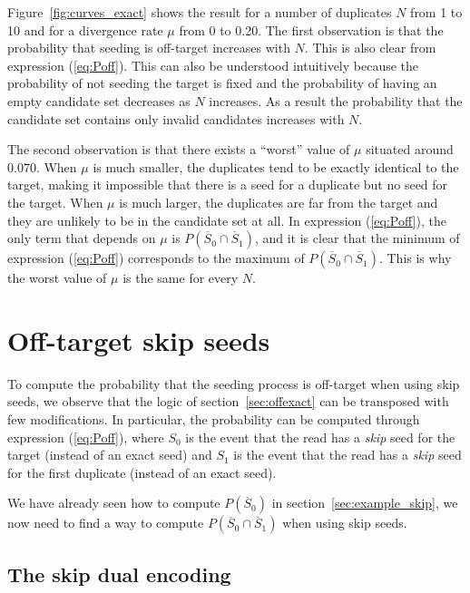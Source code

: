 \documentclass{article}
\begin{document}
Figure~\ref{fig:curves_exact} shows the result for a number of duplicates
$N$ from 1 to 10 and for a divergence rate $\mu$ from 0 to 0.20. The first
observation is that the probability that seeding is off-target increases
with $N$. This is also clear from expression (\ref{eq:Poff}). This can
also be understood intuitively because the probability of not seeding the
target is fixed and the probability of having an empty candidate set
decreases as $N$ increases. As a result the probability that the candidate
set contains only invalid candidates increases with $N$.

The second observation is that there exists a ``worst'' value of $\mu$
situated around 0.070. When $\mu$ is much smaller, the duplicates tend to
be exactly identical to the target, making it impossible that there is a
seed for a duplicate but no seed for the target. When $\mu$ is much
larger, the duplicates are far from the target and they are unlikely to be
in the candidate set at all. In expression (\ref{eq:Poff}), the only term
that depends on $\mu$ is $P(\overline{S}_0 \cap \overline{S}_1)$, and it
is clear that the minimum of expression (\ref{eq:Poff}) corresponds to the
maximum of $P(\overline{S}_0 \cap \overline{S}_1)$. This is why the worst
value of $\mu$ is the same for every $N$.


\section{Off-target skip seeds}
\label{sec_offskip}

To compute the probability that the seeding process is off-target when
using skip seeds, we observe that the logic of section~\ref{sec:offexact}
can be transposed with few modifications. In particular, the probability
can be computed through expression (\ref{eq:Poff}), where $S_0$ is the
event that the read has a \emph{skip} seed for the target (instead of an
exact seed) and $S_1$ is the event that the read has a \emph{skip} seed
for the first duplicate (instead of an exact seed).

We have already seen how to compute $P(\overline{S}_0)$ in
section~\ref{sec:example_skip}, we now need to find a way to compute
$P(\overline{S}_0 \cap \overline{S}_1)$ when using skip seeds.

\subsection{The skip dual encoding}
\end{document}
